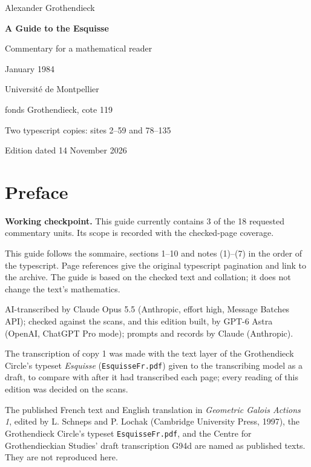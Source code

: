 \documentclass[11pt,a4paper]{article}
\newcommand{\EditionTitle}{A Guide to the Esquisse}
\newcommand{\EditionForm}{Commentary for a mathematical reader}
\begin{document}
\begin{titlepage}
\centering
\vspace*{18mm}
{\Large Alexander Grothendieck\par}
\vspace{12mm}
{\Huge\bfseries\EditionTitle\par}
\vspace{8mm}
{\Large\EditionForm\par}
\vspace{14mm}
{\large January 1984\par}
\vfill
{\large Université de Montpellier\par fonds Grothendieck, cote 119\par}
\vspace{8mm}
{\normalsize Two typescript copies: sites 2--59 and 78--135\par}
\vspace{8mm}
{\normalsize Edition dated 14 November 2026\par}
\end{titlepage}
\thispagestyle{plain}
\section*{Preface}
\noindent\textbf{Working checkpoint.} This guide currently contains 3 of the 18 requested commentary units. Its scope is recorded with the checked-page coverage.\par\smallskip
This guide follows the sommaire, sections 1–10 and notes (1)–(7) in the order of the typescript. Page references give the original typescript pagination and link to the archive. The guide is based on the checked text and collation; it does not change the text’s mathematics.

\smallskip
AI-transcribed by Claude Opus 5.5 (Anthropic, effort high, Message Batches API); checked against the scans, and this edition built, by GPT-6 Astra (OpenAI, ChatGPT Pro mode); prompts and records by Claude (Anthropic).


The transcription of copy 1 was made with the text layer of the Grothendieck Circle's typeset \textit{Esquisse} (\texttt{EsquisseFr.pdf}) given to the transcribing model as a draft, to compare with after it had transcribed each page; every reading of this edition was decided on the scans.

The published French text and English translation in \textit{Geometric Galois Actions 1}, edited by L. Schneps and P. Lochak (Cambridge University Press, 1997), the Grothendieck Circle's typeset \texttt{EsquisseFr.pdf}, and the Centre for Grothendieckian Studies' draft transcription G94d are named as published texts. They are not reproduced here.
\end{document}
